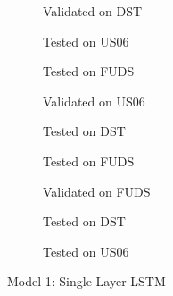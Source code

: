 \begin{figure}[htbp]
    \centering
    \begin{subfigure}[b]{0.32\textwidth}
        \centering
        
        \caption{Validated on DST}
    \end{subfigure}
    \hfill
    \begin{subfigure}[b]{0.33\textwidth}
        \centering
        
        \caption{Tested on US06}
    \end{subfigure}
    \hfill
    \begin{subfigure}[b]{0.33\textwidth}
        \centering
        
        \caption{Tested on FUDS}
    \end{subfigure}
    \begin{subfigure}[b]{0.32\textwidth}
        \centering
        
        \caption{Validated on US06}
    \end{subfigure}
    \hfill
    \begin{subfigure}[b]{0.33\textwidth}
        \centering
        
        \caption{Tested on DST}
    \end{subfigure}
    \hfill
    \begin{subfigure}[b]{0.33\textwidth}
        \centering
        
        \caption{Tested on FUDS}
    \end{subfigure}
    \begin{subfigure}[b]{0.32\textwidth}
        \centering
        
        \caption{Validated on FUDS}
    \end{subfigure}
    \hfill
    \begin{subfigure}[b]{0.33\textwidth}
        \centering
        
        \caption{Tested on DST}
    \end{subfigure}
    \hfill
    \begin{subfigure}[b]{0.33\textwidth}
        \centering
        
        \caption{Tested on US06}
    \end{subfigure}
    \caption{Model 1: Single Layer LSTM}
    \label{fig:Model-1}
\end{figure}


